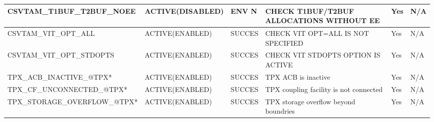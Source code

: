 \begin{landscape}
	\begin{table}[h]
		\begin{tabular}{|l|l|l|p{4.5cm}|l|l|}
			\hline
			CSVTAM\_T1BUF\_T2BUF\_NOEE    & ACTIVE(DISABLED) & ENV N  & CHECK T1BUF/T2BUF ALLOCATIONS WITHOUT EE &Yes & N/A \\ \hline
			CSVTAM\_VIT\_OPT\_ALL         & ACTIVE(ENABLED) & SUCCES & CHECK   VIT OPT=ALL IS NOT SPECIFIED     & Yes & N/A \\ \hline
			CSVTAM\_VIT\_OPT\_STDOPTS     & ACTIVE(ENABLED) & SUCCES & CHECK   VIT STDOPTS OPTION IS ACTIVE     & Yes & N/A \\ \hline
			TPX\_ACB\_INACTIVE\_@TPX*     & ACTIVE(ENABLED) & SUCCES & TPX ACB   is inactive                    & Yes & N/A \\ \hline
			TPX\_CF\_UNCONNECTED\_@TPX*   & ACTIVE(ENABLED) & SUCCES & TPX   coupling facility is not connected & Yes & N/A \\ \hline
			TPX\_STORAGE\_OVERFLOW\_@TPX* & ACTIVE(ENABLED) & SUCCES & TPX   storage overflow beyond boundries  & Yes & N/A \\ \hline
		\end{tabular}
	\end{table}
\end{landscape}

